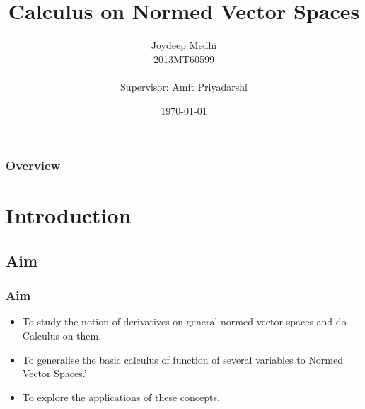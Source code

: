 \documentclass{beamer}
\title[Calculus on Norm]{Calculus on Normed Vector Spaces} %
\author[Joydeep]{Joydeep Medhi\\{\scriptsize 2013MT60599 \\~\\ \scriptsize Supervisor: Amit Priyadarshi}} %
\institute[IIT Delhi] %
{
Dept. of Mathematics \\
Indian Institute of Technology\\ %
\medskip
\textit{} %
Final Presentation
}
\date{\today} %
\begin{document}
\begin{frame}
\titlepage %
\end{frame}

\begin{frame}
\frametitle{Overview} %
\tableofcontents %
\end{frame}



\section{Introduction} %

\subsection{Aim} %

\begin{frame}
\frametitle{Aim}
\begin{itemize}
\item To study the notion of derivatives on general normed vector spaces and do Calculus on them.
\item To generalise the basic calculus of function of several variables to Normed Vector Spaces.'
\item To explore the applications of these concepts.
\end{itemize}
\end{frame}
\end{document}
